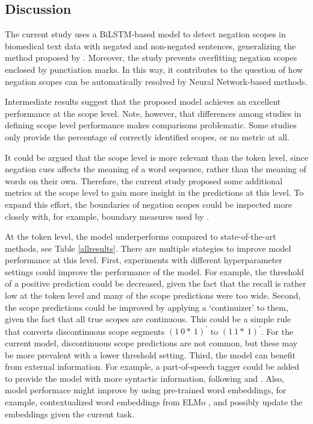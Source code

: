 \documentclass{article}
\begin{document}
\begin{multicols}{2}
\section{Discussion}

The current study uses a BiLSTM-based model to detect negation scopes in biomedical text data with negated and non-negated sentences, generalizing the method proposed by \citep{fancellu2016neural}. Moreover, the study prevents overfitting negation scopes enclosed by punctiation marks. In this way, it contributes to the question of how negation scopes can be automatically resolved by Neural Network-based methods.

Intermediate results suggest that the proposed model achieves an excellent performance at the scope level. Note, however, that differences among studies in defining scope level performance makes comparisons problematic. Some studies only provide the percentage of correctly identified scopes, or no metric at all. 

It could be argued that the scope level is more relevant than the token level, since negation cues affects the meaning of a word sequence, rather than the meaning of words on their own. Therefore, the current study proposed some additional metrics at the scope level to gain more insight in the predictions at this level. To expand this effort, the boundaries of negation scopes could be inspected more closely with, for example, boundary measures used by \cite{qian-etal-2016-speculation}. 

At the token level, the model underperforms compared to state-of-the-art methods, see Table \ref{allresults}. There are multiple stategies to improve model performance at this level. First, experiments with different hyperparameter settings could improve the performance of the model. For example, the threshold of a positive prediction could be decreased, given the fact that the recall is rather low at the token level and many of the scope predictions were too wide. Second, the scope predictions could be improved by applying a `continuizer' to them, given the fact that all true scopes are continuous. This could be a simple rule that converts discontinuous scope segments $(1~0*~1)^{\prime}$ to $(1~1*~1)^{\prime}$. For the current model, discontinuous scope predictions are not common, but these may be more prevalent with a lower threshold setting. Third, the model can benefit from external information. For example, a part-of-speech tagger could be added to provide the model with more syntactic information, following \cite{sergeeva2019} and \cite{fancellu2016neural}. Also, model performace might improve by using pre-trained word embeddings, for example, contextualized word embeddings from ELMo \citep{ELMo}, and possibly update the embeddings given the current task. 


\end{multicols}
\end{document}
